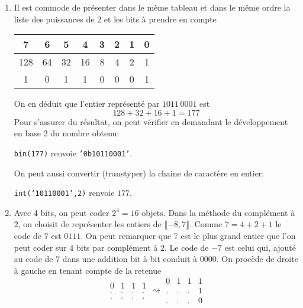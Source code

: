 \begin{enumerate}
  \item Il est commode de présenter dans le même tableau et dans le même ordre la liste des puissances de $2$ et les bits à prendre en compte
\begin{center}
\renewcommand{\arraystretch}{1.2}
\begin{tabular}{|c|c|c|c|c|c|c|c|}\hline
7   & 6  & 5  & 4  & 3 & 2 & 1 & 0\\\hline
128 & 64 & 32 & 16 & 8 & 4 & 2 & 1\\\hline
1   & 0  & 1  & 1  & 0 & 0 & 0 & 1\\\hline
\end{tabular}
\end{center}
On en déduit que l'entier représenté par $1011\,0001$ est
\begin{displaymath}
  128 + 32 + 16 + 1 = 177
\end{displaymath}
Pour s'assurer du résultat, on peut vérifier en demandant le développement en base 2 du nombre obtenu:
\begin{center}
 \texttt{bin(177)} renvoie \texttt{'0b10110001'}. 
\end{center}
On peut aussi convertir (transtyper) la chaine de caractère en entier:
\begin{center}
 \texttt{int('10110001',2)} renvoie $177$. 
\end{center}
  \item Avec 4 bits, on peut coder $2^4=16$ objets. Dans la méthode du complément à $2$, on choisit de représenter les entiers de $\llbracket -8, 7\rrbracket$.\newline
Comme $7 = 4 + 2 + 1$ le code de $7$ est $0111$. On peut remarquer que $7$ est le plus grand entier que l'on peut coder sur 4 bits par complément à $2$.\newline
Le code de $-7$ est celui qui, ajouté au code de $7$ dans une addition bit à bit conduit à $0000$.
On procède de droite à gauche en tenant compte de la retenue
\begin{displaymath}
\begin{aligned}
  0 & 1 & 1 & 1 \\
  . & . & . & . \\ \hline
  . & . & . & .
\end{aligned}
\rightsquigarrow
\begin{aligned}
  0 & 1 & 1 & 1 \\
  . & . & . & 1 \\ \hline
  . & . & . & 0
\end{aligned}

\end{displaymath}
\end{enumerate}
